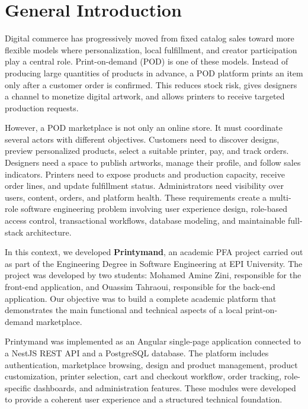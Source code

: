 \chapter*{General Introduction}

Digital commerce has progressively moved from fixed catalog sales toward more flexible models where personalization, local fulfillment, and creator participation play a central role.
Print-on-demand (POD) is one of these models.
Instead of producing large quantities of products in advance, a POD platform prints an item only after a customer order is confirmed.
This reduces stock risk, gives designers a channel to monetize digital artwork, and allows printers to receive targeted production requests.

However, a POD marketplace is not only an online store.
It must coordinate several actors with different objectives.
Customers need to discover designs, preview personalized products, select a suitable printer, pay, and track orders.
Designers need a space to publish artworks, manage their profile, and follow sales indicators.
Printers need to expose products and production capacity, receive order lines, and update fulfillment status.
Administrators need visibility over users, content, orders, and platform health.
These requirements create a multi-role software engineering problem involving user experience design, role-based access control, transactional workflows, database modeling, and maintainable full-stack architecture.

In this context, we developed \textbf{Printymand}, an academic PFA project carried out as part of the Engineering Degree in Software Engineering at EPI University.
The project was developed by two students: Mohamed Amine Zini, responsible for the front-end application, and Ouassim Tahraoui, responsible for the back-end application.
Our objective was to build a complete academic platform that demonstrates the main functional and technical aspects of a local print-on-demand marketplace.

Printymand was implemented as an Angular single-page application connected to a NestJS REST API and a PostgreSQL database.
The platform includes authentication, marketplace browsing, design and product management, product customization, printer selection, cart and checkout workflow, order tracking, role-specific dashboards, and administration features.
These modules were developed to provide a coherent user experience and a structured technical foundation.

